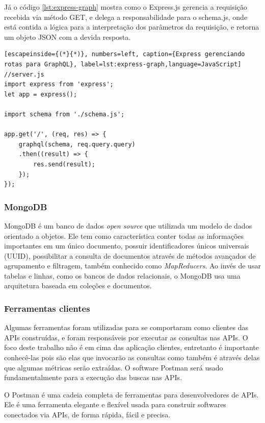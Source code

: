 Já o código \ref{lst:express-graph} mostra como o Express.js gerencia a requisição recebida via método GET, e delega a responsabilidade para o \textup{schema.js}, onde está contida a lógica para a interpretação dos parâmetros da requisição, e retorna um objeto JSON com a devida resposta.

\begin{lstlisting}[escapeinside={(*}{*)}, numbers=left, caption={Express gerenciando rotas para GraphQL}, label=lst:express-graph,language=JavaScript]
//server.js
import express from 'express';
let app = express();

import schema from './schema.js';

app.get('/', (req, res) => {
    graphql(schema, req.query.query)
    .then((result) => {
        res.send(result);
    });
});

\end{lstlisting}

\subsubsection*{MongoDB}

MongoDB é um banco de dados \textit{open source} que utilizada um modelo de dados orientado a objetos. Ele tem como característica conter todas as informações importantes em um único documento, possuir identificadores únicos universais (UUID), possibilitar a consulta de documentos através de métodos avançados de agrupamento e filtragem, também conhecido como \textit{MapReducers}. Ao invés de usar tabelas e linhas, como os bancos de dados relacionais, o MongoDB usa uma arquitetura baseada em coleções e documentos.


\subsubsection*{Ferramentas clientes}

Algumas ferramentas foram utilizadas para se comportaram como clientes das APIs construídas, e foram responsáveis por executar as consultas nas APIs. O foco deste trabalho não é em cima das aplicação clientes, entretanto é importante conhecê-las pois são elas que invocarão as consultas como também é através delas que algumas métricas serão extraídas. O software Postman será usado fundamentalmente para a execução das buscas nas APIs.

O Postman é uma cadeia completa de ferramentas para desenvolvedores de APIs. Ele é uma ferramenta elegante e flexível usada para construir softwares conectados via APIs, de forma rápida, fácil e precisa.

